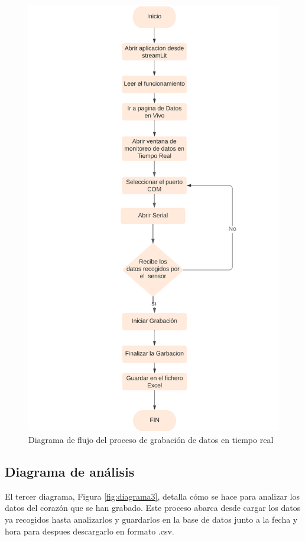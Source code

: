 \begin{figure}[h]
\centering
\includegraphics[width=\textwidth]{img/Diagramas/diagrama_datosvivo.png}
\caption{Diagrama de flujo del proceso de grabación de datos en tiempo real}
\label{fig:diagrama2}
\end{figure}

\subsection{Diagrama de análisis}

El tercer diagrama, Figura \ref{fig:diagrama3}, detalla cómo se hace para analizar los datos del corazón que se han grabado. Este proceso abarca desde cargar los datos ya recogidos hasta analizarlos y guardarlos en la base de datos junto a la fecha y hora para despues descargarlo en formato .csv.

